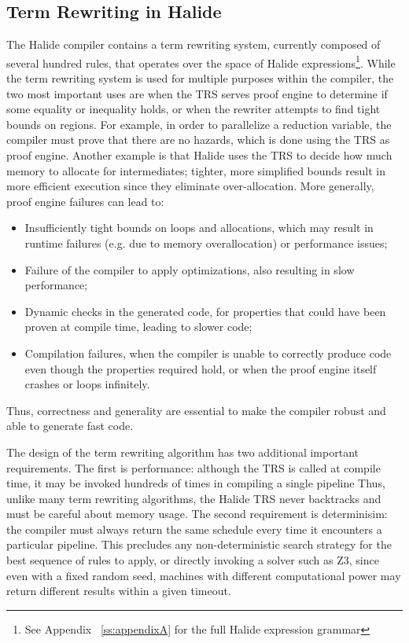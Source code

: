 \documentclass[sigplan,10pt,review,anonymous]{acmart}\settopmatter{printfolios=true,printccs=false,printacmref=false}
\begin{document}
\subsection{Term Rewriting in Halide}

The Halide compiler contains a term rewriting system, currently composed of
several hundred rules, that operates over the space of Halide
expressions\footnote{See Appendix ~\ref{ss:appendixA} for the full Halide
  expression grammar}. While the term rewriting system is used for multiple
purposes within the compiler, the two most important
uses are when the TRS serves proof engine to determine if
some equality or inequality holds, or when the rewriter attempts to find tight
bounds on regions. For example, in order to parallelize a
reduction variable, the compiler must prove that there are no hazards, which is
done using the TRS as proof engine.  Another example is that Halide uses
the TRS to decide how much memory to allocate for intermediates; tighter, more
simplified bounds result in more efficient execution since they eliminate over-allocation.
More generally, proof engine failures can lead to:
\begin{itemize}
\item Insufficiently tight bounds on loops and allocations, which may result in
  runtime failures (e.g. due to memory overallocation) or performance issues;

\item Failure of the compiler to apply optimizations, also resulting in slow performance;

\item Dynamic checks in the generated code, for properties that could have been proven
  at compile time, leading to slower code;

\item Compilation failures, when the compiler is unable to correctly produce code
  even though the properties required hold, or when the proof engine itself crashes
  or loops infinitely.
\end{itemize}
Thus, correctness and generality are essential to make the compiler robust and
able to generate fast code.

The design of the term rewriting algorithm has two additional important
requirements. The first is performance: although the TRS is called at
compile time, it may be invoked hundreds of times in compiling a single pipeline
Thus, unlike many term rewriting algorithms, the Halide TRS
never backtracks and must be careful about memory usage. The second requirement is determinisim: the compiler must
always return the same schedule every time it encounters a particular pipeline.
This precludes any non-deterministic search strategy for the best sequence of
rules to apply, or directly invoking a solver such as Z3, since even with a
fixed random seed, machines with different computational power may return
different results within a given timeout.
\end{document}
